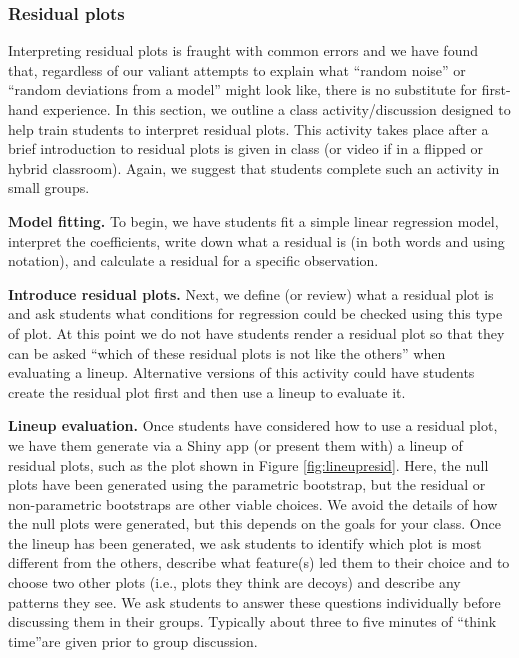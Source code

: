 \documentclass[12pt]{article}
\begin{document}
\hypertarget{residual-plots}{%
\subsubsection{Residual plots}\label{residual-plots}}

Interpreting residual plots is fraught with common errors and we have
found that, regardless of our valiant attempts to explain what ``random
noise'' or ``random deviations from a model'' might look like, there is
no substitute for first-hand experience. In this section, we outline a
class activity/discussion designed to help train students to interpret
residual plots. This activity takes place after a brief introduction to
residual plots is given in class (or video if in a flipped or hybrid
classroom). Again, we suggest that students complete such an activity in
small groups.

\textbf{Model fitting.} To begin, we have students fit a simple linear
regression model, interpret the coefficients, write down what a residual
is (in both words and using notation), and calculate a residual for a
specific observation.

\textbf{Introduce residual plots.} Next, we define (or review) what a
residual plot is and ask students what conditions for regression could
be checked using this type of plot. At this point we do not have
students render a residual plot so that they can be asked ``which of
these residual plots is not like the others'' when evaluating a lineup.
Alternative versions of this activity could have students create the
residual plot first and then use a lineup to evaluate it.

\textbf{Lineup evaluation.} Once students have considered how to use a
residual plot, we have them generate via a Shiny app (or present them
with) a lineup of residual plots, such as the plot shown in Figure
\ref{fig:lineupresid}. Here, the null plots have been generated using
the parametric bootstrap, but the residual or non-parametric bootstraps
are other viable choices. We avoid the details of how the null plots
were generated, but this depends on the goals for your class. Once the
lineup has been generated, we ask students to identify which plot is
most different from the others, describe what feature(s) led them to
their choice and to choose two other plots (i.e., plots they think are
decoys) and describe any patterns they see. We ask students to answer
these questions individually before discussing them in their groups.
Typically about three to five minutes of ``think time''are given prior
to group discussion.
\end{document}
